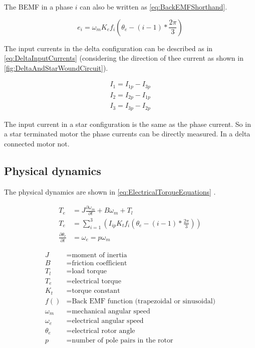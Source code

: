 \documentclass[]{report}
\begin{document}
The BEMF in a phase $i$ can also be written as \autoref{eq:BackEMFShorthand}. 

\begin{equation} \label{eq:BackEMFShorthand}
	e_i = \omega_m K_e f_i\left(\theta_e - (i - 1)*\frac{2\pi}{3}\right)
\end{equation}

The input currents in the delta configuration can be described as in \autoref{eq:DeltaInputCurrents} (considering the direction of thee current as shown in \autoref{fig:DeltaAndStarWoundCircuit}).

\begin{equation} \label{eq:DeltaInputCurrents}
	\begin{split}
	I_1 = I_{1p} - I_{3p} \\
	I_2 = I_{2p} - I_{1p} \\
	I_3 = I_{3p} - I_{2p}
	\end{split}
\end{equation}

The input current in a star configuration is the same as the phase current. So in a star terminated motor the phase currents can be directly measured. In a delta connected motor not.

\subsection*{Physical dynamics}
The physical dynamics are shown in \autoref{eq:ElectricalTorqueEquations} \cite{BLDC_winding_models}.

\begin{equation} \label{eq:ElectricalTorqueEquations}
	\begin{split}
		T_e &= J\frac{\partial \omega_m}{\partial t} + B\omega_m + T_l \\
		T_e &= \sum_{i=1}^{3}\left(I_{ip}K_tf_i\left(\theta_e - (i - 1)*\frac{2\pi}{3}\right)\right) \\
		\frac{\partial \theta_e}{\partial t} &= \omega_e = p\omega_m
	\end{split}
\end{equation}

\begin{equation*}
	\begin{split}
		J &= \text{moment of inertia} \\
		B &= \text{friction coefficient} \\
		T_l &= \text{load torque} \\
		T_e &= \text{electrical torque} \\
		K_t &= \text{torque constant} \\
		f() &= \text{Back EMF function (trapezoidal or sinusoidal)} \\
		\omega_m &= \text{mechanical angular speed} \\
		\omega_e &= \text{electrical angular speed} \\
		\theta_e &= \text{electrical rotor angle} \\
		p &= \text{number of pole pairs in the rotor}
	\end{split}
\end{equation*}
\end{document}
